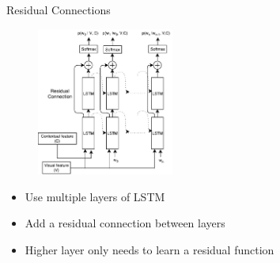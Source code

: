 \documentclass{beamer}
\begin{document}
\begin{frame}{Residual Connections}
    \begin{figure}[h]
        \centering
        \includegraphics[width=0.4\textwidth]{images/ACMM_MultilayerResidualLSTM.pdf}
    \end{figure}
    \begin{itemize}
        \item Use multiple layers of LSTM 
        \item Add a residual connection between layers~\cite{He2015} 
        \item Higher layer only needs to learn a residual function 
    \end{itemize}
\end{frame}
\end{document}
